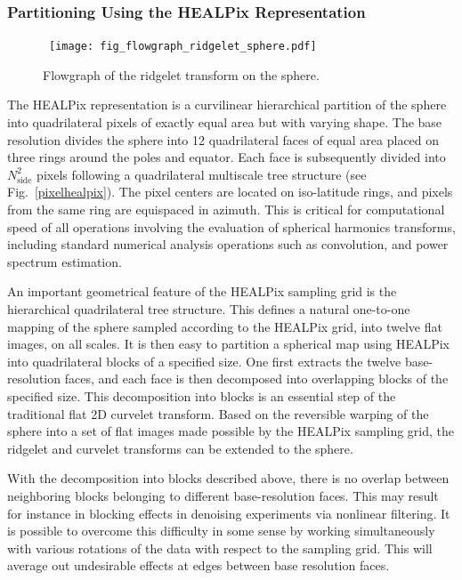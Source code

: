 \subsubsection{Partitioning Using the HEALPix Representation}

 \begin{figure}
\centerline{
\hbox{
\texttt{[image: fig\_flowgraph\_ridgelet\_sphere.pdf]}
}}
\caption{Flowgraph of the ridgelet transform on the sphere.}
\label{Figure:rid_sphere}
\end{figure}

The HEALPix representation is a curvilinear hierarchical partition of the sphere into quadrilateral pixels 
of exactly equal area but with varying shape. The base resolution divides the sphere into 12 quadrilateral 
faces of equal area placed on three rings around the poles and equator. Each face is subsequently divided 
into $N_{\mathrm{side}}^{2}$ pixels following a quadrilateral multiscale tree structure (see Fig.~\ref{pixelhealpix}). 
The pixel centers are located on iso-latitude rings, and pixels from the same ring are equispaced in azimuth. 
This is critical for computational speed of all operations involving the evaluation of spherical harmonics transforms, 
including standard numerical analysis operations such as convolution, and power spectrum estimation. 

An important geometrical feature of the HEALPix sampling grid is the hierarchical quadrilateral tree structure. 
This defines a natural one-to-one mapping of the sphere sampled according to the HEALPix grid, into twelve 
flat images, on all scales. It is then easy to partition a spherical map using HEALPix into quadrilateral blocks 
of a specified size. One first extracts the twelve base-resolution faces, and each face is then decomposed into 
overlapping blocks of the specified size. This decomposition into blocks is an essential step of the traditional 
flat 2D curvelet transform. Based on the reversible warping of the sphere into a set of flat images made possible 
by the HEALPix sampling grid, the ridgelet and curvelet transforms can be extended to the sphere. 

With the decomposition into blocks described above, there is no overlap between neighboring blocks belonging 
to different base-resolution faces. This may result for instance in blocking effects in denoising experiments 
via nonlinear filtering. It is possible to overcome this difficulty in some sense by working simultaneously 
with various rotations of the data with respect to the sampling grid. This will average out undesirable effects 
at edges between base resolution faces. 

